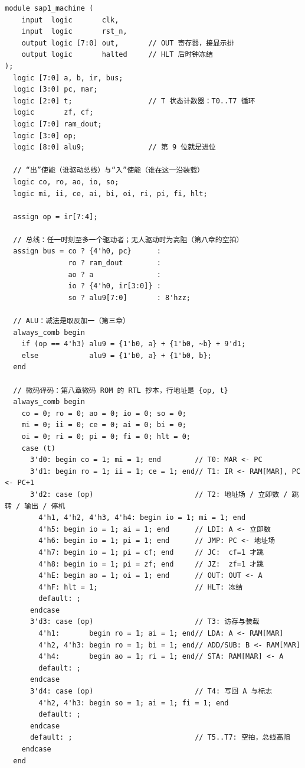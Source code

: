 \begin{lstlisting}
module sap1_machine (
    input  logic       clk,
    input  logic       rst_n,
    output logic [7:0] out,       // OUT 寄存器，接显示排
    output logic       halted     // HLT 后时钟冻结
);
  logic [7:0] a, b, ir, bus;
  logic [3:0] pc, mar;
  logic [2:0] t;                  // T 状态计数器：T0..T7 循环
  logic       zf, cf;
  logic [7:0] ram_dout;
  logic [3:0] op;
  logic [8:0] alu9;               // 第 9 位就是进位

  // “出”使能（谁驱动总线）与“入”使能（谁在这一沿装载）
  logic co, ro, ao, io, so;
  logic mi, ii, ce, ai, bi, oi, ri, pi, fi, hlt;

  assign op = ir[7:4];

  // 总线：任一时刻至多一个驱动者；无人驱动时为高阻（第八章的空拍）
  assign bus = co ? {4'h0, pc}      :
               ro ? ram_dout        :
               ao ? a               :
               io ? {4'h0, ir[3:0]} :
               so ? alu9[7:0]       : 8'hzz;

  // ALU：减法是取反加一（第三章）
  always_comb begin
    if (op == 4'h3) alu9 = {1'b0, a} + {1'b0, ~b} + 9'd1;
    else            alu9 = {1'b0, a} + {1'b0, b};
  end

  // 微码译码：第八章微码 ROM 的 RTL 抄本，行地址是 {op, t}
  always_comb begin
    co = 0; ro = 0; ao = 0; io = 0; so = 0;
    mi = 0; ii = 0; ce = 0; ai = 0; bi = 0;
    oi = 0; ri = 0; pi = 0; fi = 0; hlt = 0;
    case (t)
      3'd0: begin co = 1; mi = 1; end        // T0: MAR <- PC
      3'd1: begin ro = 1; ii = 1; ce = 1; end// T1: IR <- RAM[MAR], PC <- PC+1
      3'd2: case (op)                        // T2: 地址场 / 立即数 / 跳转 / 输出 / 停机
        4'h1, 4'h2, 4'h3, 4'h4: begin io = 1; mi = 1; end
        4'h5: begin io = 1; ai = 1; end      // LDI: A <- 立即数
        4'h6: begin io = 1; pi = 1; end      // JMP: PC <- 地址场
        4'h7: begin io = 1; pi = cf; end     // JC:  cf=1 才跳
        4'h8: begin io = 1; pi = zf; end     // JZ:  zf=1 才跳
        4'hE: begin ao = 1; oi = 1; end      // OUT: OUT <- A
        4'hF: hlt = 1;                       // HLT: 冻结
        default: ;
      endcase
      3'd3: case (op)                        // T3: 访存与装载
        4'h1:       begin ro = 1; ai = 1; end// LDA: A <- RAM[MAR]
        4'h2, 4'h3: begin ro = 1; bi = 1; end// ADD/SUB: B <- RAM[MAR]
        4'h4:       begin ao = 1; ri = 1; end// STA: RAM[MAR] <- A
        default: ;
      endcase
      3'd4: case (op)                        // T4: 写回 A 与标志
        4'h2, 4'h3: begin so = 1; ai = 1; fi = 1; end
        default: ;
      endcase
      default: ;                             // T5..T7: 空拍，总线高阻
    endcase
  end


\end{lstlisting}
